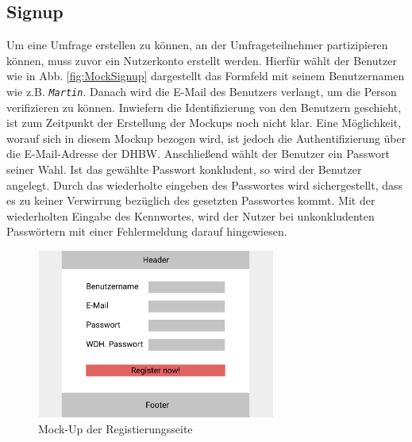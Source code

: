 \subsection{Signup}
\label{ssec:konzept:client:signup}
Um eine Umfrage erstellen zu können, an der Umfrageteilnehmer partizipieren können, muss zuvor ein Nutzerkonto erstellt werden. 
Hierfür wählt der Benutzer wie in Abb. \ref{fig:MockSignup} dargestellt das Formfeld mit seinem Benutzernamen wie z.B. \emph{\texttt{Martin}}. 
Danach wird die E-Mail des Benutzers verlangt, um die Person verifizieren zu können. 
Inwiefern die Identifizierung von den Benutzern geschieht, ist zum Zeitpunkt der Erstellung der Mockups noch nicht klar. 
Eine Möglichkeit, worauf sich in diesem Mockup bezogen wird, ist jedoch die Authentifizierung über die E-Mail-Adresse der DHBW. 
Anschließend wählt der Benutzer ein Passwort seiner Wahl. 
Ist das gewählte Passwort konkludent, so wird der Benutzer angelegt.
Durch das wiederholte eingeben des Passwortes wird sichergestellt, dass es zu keiner Verwirrung bezüglich des gesetzten Passwortes kommt. 
Mit der wiederholten Eingabe des Kennwortes, wird der Nutzer bei unkonkludenten Passwörtern mit einer Fehlermeldung darauf hingewiesen.

\begin{figure}[h]
	\centering
	\includegraphics[width=0.7\textwidth]{img/konzeption/client/register}
	\captionsetup{justification=centering, format=plain}
	\caption[Mock-Up der Startseite]{Mock-Up der Registierungsseite \\\figma}
	\label{fig:MockRegister}
\end{figure}